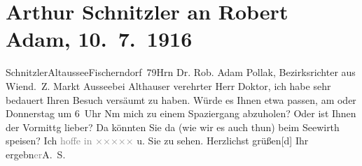 

         
         \renewcommand{\erwaehntePersonen}{Personen: Robert Adam,  Althauser}
         \renewcommand{\erwaehnteOrte}{Orte: Altaussee, Bad Aussee, Fischerndorf, Seewirt, Wien}
         \renewcommand{\erwaehnteWerke}{}
               \section[Arthur Schnitzler an Robert Adam, 10. 7. 1916]{ Arthur Schnitzler an Robert Adam, 10. 7. 1916}\nopagebreak{}\rehead{ }\begin{ledgroupsized}[t]{13cm}\normalsize\beginnumbering{} \toendnotes[C]{\smallbreak\pagebreak[2]} 
\toendnotes[C]{\smallbreak}\pstart{}{\pb}Schnitzler\pend{}\pstart{}Altaussee\pend{}\pstart{}Fischerndorf 79\pend{}{\bigskip}\pstart{}Hrn Dr. Rob. Adam Pollak, Bezirksrichter aus Wien\pend{}\pstart{}d. Z. Markt Aussee\pend{}\pstart{}bei Althauser\pend{}{\bigskip}\pstart
           \noindent{}{\pb}verehrter Herr Doktor, ich habe sehr bedauert Ihren Besuch versäumt
               zu haben. Würde es Ihnen etwa passen, am \label{K_L02230-1v}\label{K_L02230-1h} oder Donnerstag um 6 Uhr Nm mich zu einem
               Spaziergang abzuholen? Oder ist Ihnen der Vormittg lieber? Da könnten Sie da{\geminationn} (wie wir es auch thun) beim Seewirth speisen? Ich \textcolor{gray}{hoffe in }{ }\textcolor{gray}{×}\-\textcolor{gray}{×}\-\textcolor{gray}{×}\-\textcolor{gray}{×}\-\textcolor{gray}{×} u. Sie zu sehen. Herzlichst
                  grüßen{[}d{]} Ihr ergebn\textcolor{gray}{er}\spacefill\mbox{A. S.}\pend
           
         
         \endnumbering{}\end{ledgroupsized}  \newcommand{\dateiname}{L02230}\newcommand{\titel}{Arthur Schnitzler an Robert Adam, 10. 7. 1916}\newcommand{\editorInnen}{Martin Anton Müller und Gerd-Hermann Susen}
      